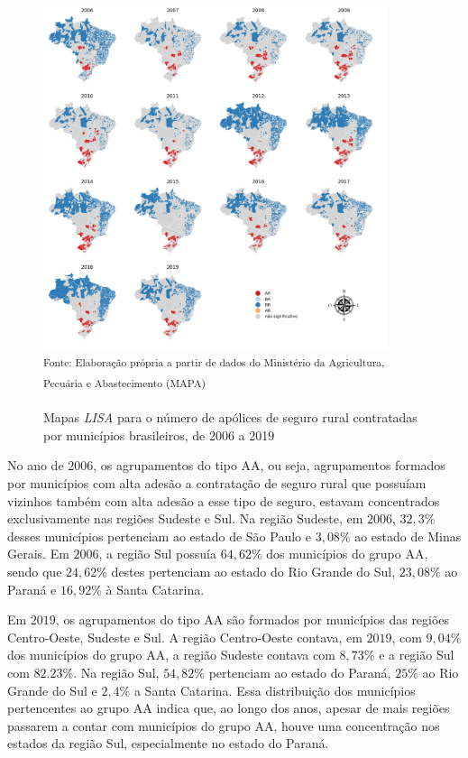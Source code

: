 \begin{figure}[!htp]
	\centering
	\caption{Mapas \textit{LISA} para o número de apólices de seguro rural contratadas por municípios brasileiros, de 2006 a 2019}
	\includegraphics[width=0.9\textwidth]{figuras/map_lisa_apolices_contratadas.png}\\
	\small \textsuperscript {Fonte: Elaboração própria a partir de dados do Ministério da Agricultura, Pecuária e Abastecimento (MAPA)}
    \label{map_lisa_contratadas}
\end{figure}

No ano de $2006$, os agrupamentos do tipo AA, ou seja, agrupamentos formados por municípios com alta adesão a contratação de seguro rural que possuíam vizinhos também com alta adesão a esse tipo de seguro, estavam concentrados exclusivamente nas regiões Sudeste e Sul. Na região Sudeste, em $2006$, $32,3\%$ desses  municípios pertenciam ao estado de São Paulo e $3,08\%$ ao estado de Minas Gerais. Em $2006$, a região Sul possuía $64,62\%$ dos municípios do grupo AA, sendo que $24,62\%$ destes pertenciam ao estado do Rio Grande do Sul, $23,08\%$ ao Paraná e $16,92\%$ à Santa Catarina.  

Em $2019$, os agrupamentos do tipo AA são formados por municípios das regiões Centro-Oeste, Sudeste e Sul. A região Centro-Oeste contava, em $2019$, com $9,04\%$ dos municípios do grupo AA, a região Sudeste contava com $8,73\%$  e a região Sul com $82.23\%$. Na região Sul, $54,82\%$ pertenciam ao estado do Paraná, $25\%$ ao Rio Grande do Sul e $2,4\%$ a Santa Catarina. Essa distribuição dos municípios pertencentes ao grupo AA indica que, ao longo dos anos, apesar de mais regiões passarem a contar com municípios do grupo AA, houve uma concentração nos estados da região Sul, especialmente no estado do Paraná.

